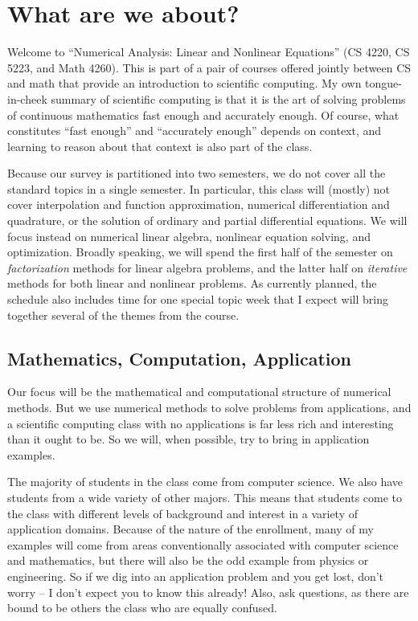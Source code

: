 \documentclass[12pt, leqno]{article}
\begin{document}

\section{What are we about?}

Welcome to ``Numerical Analysis: Linear and Nonlinear Equations'' (CS
4220, CS 5223, and Math 4260).  This is part of a pair of courses
offered jointly between CS and math that provide an introduction to
scientific computing.  My own tongue-in-cheek summary of scientific
computing is that it is the art of solving problems of continuous
mathematics fast enough and accurately enough.  Of course, what
constitutes ``fast enough'' and ``accurately enough'' depends on
context, and learning to reason about that context is also part of the
class.

Because our survey is partitioned into two semesters, we do not cover
all the standard topics in a single semester.  In particular, this class
will (mostly) not cover interpolation and function approximation,
numerical differentiation and quadrature, or the solution of ordinary
and partial differential equations.  We will focus instead on numerical
linear algebra, nonlinear equation solving, and optimization.  Broadly
speaking, we will spend the first half of the semester on {\em
factorization} methods for linear algebra problems, and the latter half
on {\em iterative} methods for both linear and nonlinear problems.  As
currently planned, the schedule also includes time for one special topic
week that I expect will bring together several of the themes from the
course.

\subsection{Mathematics, Computation, Application}

Our focus will be the mathematical and computational structure of
numerical methods.  But we use numerical methods to solve
problems from applications, and a scientific computing class with
no applications is far less rich and interesting than it ought to be.
So we will, when possible, try to bring in application examples.

The majority of students in the class come from computer science.  We
also have students from a wide variety of other majors.  This means
that students come to the class with different levels of background
and interest in a variety of application domains.  Because of the
nature of the enrollment, many of my examples will come from areas
conventionally associated with computer science and mathematics, but
there will also be the odd example from physics or engineering.  So if
we dig into an application problem and you get lost, don't worry -- I
don't expect you to know this already!  Also, ask questions, as there
are bound to be others the class who are equally confused.
\end{document}

